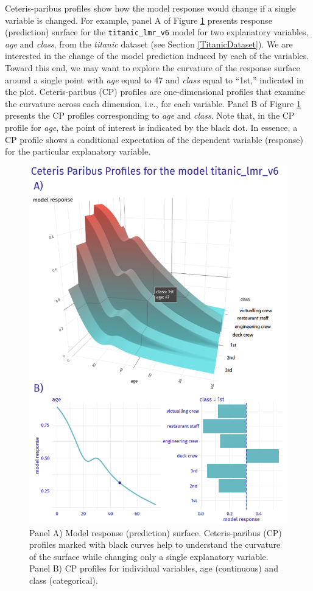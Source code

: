\documentclass[]{krantz}
\begin{document}
Ceteris-paribus profiles show how the model response would change if a single variable is changed. For example, panel A of Figure \ref{fig:modelResponseCurveLine} presents response (prediction) surface for the \texttt{titanic\_lmr\_v6} model for two explanatory variables, \emph{age} and \emph{class}, from the \emph{titanic} dataset (see Section \ref{TitanicDataset}). We are interested in the change of the model prediction induced by each of the variables. Toward this end, we may want to explore the curvature of the response surface around a single point with \emph{age} equal to 47 and \emph{class} equal to ``1st,'' indicated in the plot. Ceteris-paribus (CP) profiles are one-dimensional profiles that examine the curvature across each dimension, i.e., for each variable. Panel B of Figure \ref{fig:modelResponseCurveLine} presents the CP profiles corresponding to \emph{age} and \emph{class}. Note that, in the CP profile for \emph{age}, the point of interest is indicated by the black dot. In essence, a CP profile shows a conditional expectation of the dependent variable (response) for the particular explanatory variable.

\begin{figure}

{\centering \includegraphics[width=0.6\linewidth]{figure/profile_age_class} 

}

\caption{Panel A) Model response (prediction) surface. Ceteris-paribus (CP) profiles marked with black curves help to understand the curvature of the surface while changing only a single explanatory variable. Panel B) CP profiles for individual variables, age (continuous) and class (categorical).}\label{fig:modelResponseCurveLine}
\end{figure}
\end{document}
